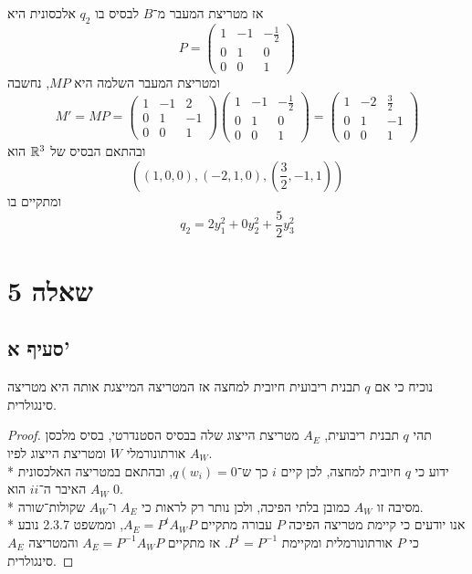 אז מטריצת המעבר מ־$B$ לבסיס בו $q_2$ אלכסונית היא
\[
	P = \begin{pmatrix}
		1 & -1 & -\frac{1}{2} \\
		0 & 1 & 0 \\
		0 & 0 & 1
	\end{pmatrix}
\]
ומטריצת המעבר השלמה היא $MP$, נחשבה
\[
	M' = MP = 
	\begin{pmatrix} 1 & -1 & 2 \\
		0 & 1 & -1 \\
		0 & 0 & 1
	\end{pmatrix}
	\begin{pmatrix}
		1 & -1 & -\frac{1}{2} \\
		0 & 1 & 0 \\
		0 & 0 & 1
	\end{pmatrix}
	= \begin{pmatrix}
		1 & -2 & \frac{3}{2} \\
		0 & 1 & -1 \\
		0 & 0 & 1
	\end{pmatrix}
\]
ובהתאם הבסיס של $\mathbb{R}^3$ הוא
\[
	((1, 0, 0), (-2, 1, 0), (\frac{3}{2}, -1, 1))
\]
ומתקיים בו
\[
	q_2 = 2y_1^2 + 0y_2^2 + \frac{5}{2}y_3^2
\]

\section{שאלה 5}
\subsection{סעיף א'}
נוכיח כי אם $q$ תבנית ריבועית חיובית למחצה אז המטריצה המייצגת אותה היא מטריצה סינגולרית.
\begin{proof}
	תהי $q$ תבנית ריבועית, $A_E$ מטריצת הייצוג שלה בבסיס הסטנדרטי, בסיס מלכסן אורתונורמלי $W$ ומטריצת הייצוג לפיו $A_W$. \\*
	ידוע כי $q$ חיובית למחצה, לכן קיים $i$ כך ש־$q(w_i) = 0$, ובהתאם במטריצה האלכסונית $A_W$ האיבר ה־$ii$ הוא $0$. \\*
	מסיבה זו $A_W$ כמובן בלתי הפיכה, ולכן נותר רק לראות כי $A_E$ ו־$A_W$ שקולות־שורה. \\*
	אנו יודעים כי קיימת מטריצה הפיכה $P$ עבורה מתקיים $A_E = P^t A_W P$, וממשפט 2.3.7 נובע כי $P$ אורתונורמלית ומקיימת $P^t = P^{-1}$.
	אז מתקיים $A_E = P^{-1} A_W P$ והמטריצה $A_E$ סינגולרית.
\end{proof}

